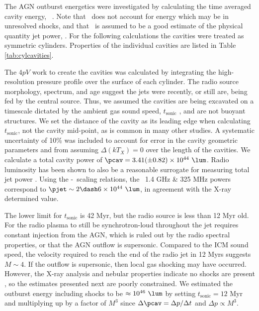 \documentclass[useAMS,usenatbib]{mn2e}
\begin{document}
The AGN outburst energetics were investigated by calculating the time
averaged cavity energy, \pcav\ \citep[see][for a
  review]{mcnamrev}. Note that \pcav\ does not account for energy
which may be in unresolved shocks, and that \pcav\ is assumed to be a
good estimate of the physical quantity jet power, \pjet. For the
following calculations the cavities were treated as symmetric
cylinders. Properties of the individual cavities are listed in Table
\ref{tab:cylcavities}.


The $4pV$ work to create the cavities was calculated by integrating
the high-resolution pressure profile over the surface of each
cylinder. The radio source morphology, spectrum, and age suggest the
jets were recently, or still are, being fed by the central
source. Thus, we assumed the cavities are being excavated on a
timescale dictated by the ambient gas sound speed,
$t_{\mathrm{sonic}}$ \citep[see][]{birzan04}, and are not buoyant
structures. We set the distance of the cavity as its leading edge when
calculating $t_{\mathrm{sonic}}$, not the cavity mid-point, as is
common in many other studies. A systematic uncertainty of 10\% was
included to account for error in the cavity geometric parameters and
from assuming $\Delta (kT_X) = 0$ over the length of the cavities. We
calculate a total cavity power of $\pcav = 3.41 (\pm 0.82) \times
10^{44} ~\lum$. Radio luminosity has been shown to also be a
reasonable surrogate for measuring total jet power
\citep{birzan08}. Using the \citet{pjet} \pjet-\prad\ scaling
relations, the \irs\ 1.4 GHz \& 325 MHz powers correspond to $\pjet
\sim 2 \dash 6 \times 10^{44} ~\lum$, in agreement with the X-ray
determined value.

The lower limit for $t_{\mathrm{sonic}}$ is 42 Myr, but the radio
source is less than 12 Myr old. For the radio plasma to still be
synchrotron-loud throughout the jet requires constant injection from
the AGN, which is ruled out by the radio spectral properties, or that
the AGN outflow is supersonic. Compared to the ICM sound speed, the
velocity required to reach the end of the radio jet in 12 Myrs
suggests $M \sim 4$. If the outflow is supersonic, then local gas
shocking may have occurred. However, the X-ray analysis and nebular
properties indicate no shocks are present \citep{1996MNRAS.283.1003C,
  2000AJ....120..562T}, so the estimates presented next are poorly
constrained. We estimated the outburst energy including shocks to be
$\approx 10^{46} ~\lum$ by setting $t_{\mathrm{sonic}} = 12$ Myr and
multiplying up by a factor of $M^3$ since $\Delta \pcav = \Delta p /
\Delta t$ and $\Delta p \propto M^3$.
\end{document}
